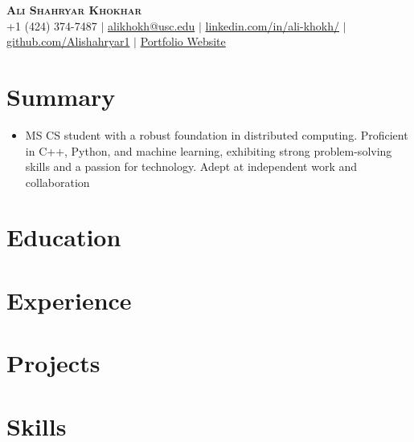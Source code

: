 \documentclass[letterpaper,11pt]{article}
\newcommand{\resumeItem}[1]{
  \item\small{
    {#1 \vspace{-2pt}}
  }
}
\newcommand{\resumeSubHeadingListStart}{\begin{itemize}[leftmargin=0.15in, label={}]}
\newcommand{\resumeSubHeadingListEnd}{\end{itemize}}
\begin{document}
\begin{center}
    \textbf{\Huge \scshape Ali Shahryar Khokhar} \\ \vspace{1pt} %
    \small +1 (424) 374-7487 %
    $|$ \href{mailto:alikhokh@usc.edu}{alikhokh@usc.edu} %
    $|$ \href{https://www.linkedin.com/in/ali-khokh/}{linkedin.com/in/ali-khokh/} %
    $|$ \href{https://github.com/Alishahryar1}{github.com/Alishahryar1} %
    $|$ \href{https://alishahryar1.github.io/}{Portfolio Website} %
\end{center}
\section{Summary}
\resumeSubHeadingListStart
    \resumeItem{MS CS student with a robust foundation in distributed computing. Proficient in C++, Python, and machine learning, exhibiting strong problem-solving skills and a passion for technology. Adept at independent work and collaboration}
\resumeSubHeadingListEnd
\vspace{-10pt}
\section{Education}
  \resumeSubHeadingListStart
  \resumeSubHeadingListEnd
\section{Experience}
\resumeSubHeadingListStart
\resumeSubHeadingListEnd
\section{Projects}
    \resumeSubHeadingListStart
    \resumeSubHeadingListEnd
\section{Skills}
 \begin{itemize}[leftmargin=0.15in, label={}]
    \small{\item{
     }}
 \end{itemize}
\end{document}
